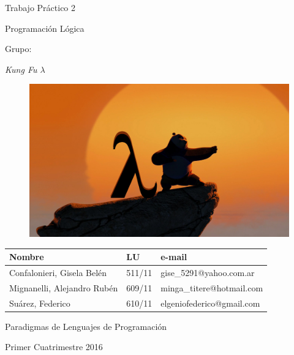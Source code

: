 \documentclass[a4paper]{article}
\begin{document}
\pagestyle{empty}
\begin{center}

\vspace*{1cm}

\begin{Huge}
Trabajo Práctico 2

Programación Lógica
\end{Huge}

\vspace*{0.5cm}
%
%

\begin{Large}
Grupo:

\vspace*{0.3cm}
\end{Large}

\begin{Huge}
{\it Kung Fu $\lambda$}
\end{Huge}

\begin{figure}[!htb]
  \includegraphics[scale=0.25]{LambdaPoKungFuPose.jpg}
\end{figure}

\vspace*{1cm}

\begin{table}[!htb]
\begin{center}
\begin{tabular}{|l|l|l|}
\hline
Nombre & LU & e-mail \\
\hline
Confalonieri, Gisela Belén & 511/11 & gise\_5291@yahoo.com.ar \\
Mignanelli, Alejandro Rubén & 609/11 & minga\_titere@hotmail.com \\
Suárez, Federico & 610/11 & elgeniofederico@gmail.com \\
\hline
\end{tabular}
\end{center}
\end{table}

\vspace*{1cm}

\begin{large}
Paradigmas de Lenguajes de Programación

Primer Cuatrimestre 2016
\end{large}

\end{center}
\end{document}
